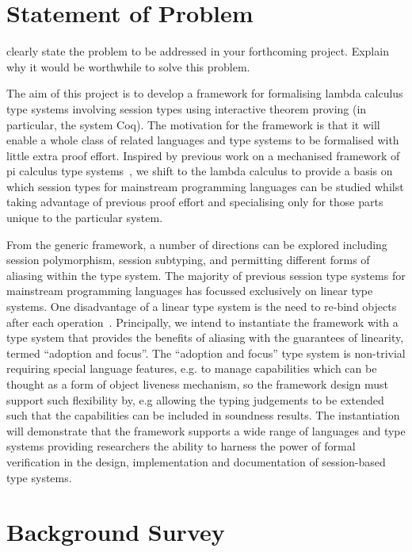 \documentclass{mprop}
\begin{document}
\section{Statement of Problem}

clearly state the problem to be addressed in your forthcoming project. Explain
why it would be worthwhile to solve this problem.

The aim of this project is to develop a framework for formalising lambda
calculus type systems involving session types using interactive theorem
proving (in particular, the system Coq). The motivation for the framework is
that it will enable a whole class of related languages and type systems to be
formalised with little extra proof effort. Inspired by previous work on a
mechanised framework of pi calculus type systems~\cite{Gay:2001:FFP}, we shift
to the lambda calculus to provide a basis on which session types for
mainstream programming languages can be studied whilst taking advantage of
previous proof effort and specialising only for those parts unique to the
particular system.

From the generic framework, a number of directions can be explored including
session polymorphism, session subtyping, and permitting different forms of
aliasing within the type system. The majority of previous session type systems
for mainstream programming languages has focussed exclusively on linear type
systems. One disadvantage of a linear type system is the need to re-bind
objects after each operation~\cite{Gay:2010:LTT}. Principally, we intend to
instantiate the framework with a type system that provides the benefits of
aliasing with the guarantees of linearity, termed ``adoption and focus''. The
``adoption and focus'' type system is non-trivial requiring special language
features, e.g. to manage capabilities which can be thought as a form of object
liveness mechanism, so the framework design must support such flexibility by,
e.g allowing the typing judgements to be extended such that the capabilities
can be included in soundness results. The instantiation will demonstrate that
the framework supports a wide range of languages and type systems providing
researchers the ability to harness the power of formal verification in the
design, implementation and documentation of session-based type systems.

\section{Background Survey}
\end{document}
